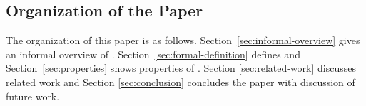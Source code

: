 
\subsection{Organization of the Paper}

The organization of this paper is as follows.
Section~\ref{sec:informal-overview} gives an informal overview of
\LMD.  Section~\ref{sec:formal-definition} defines \LMD and
Section~\ref{sec:properties} shows properties of \LMD.  Section
\ref{sec:related-work} discusses related work and Section
\ref{sec:conclusion} concludes the paper with discussion of future
work.
